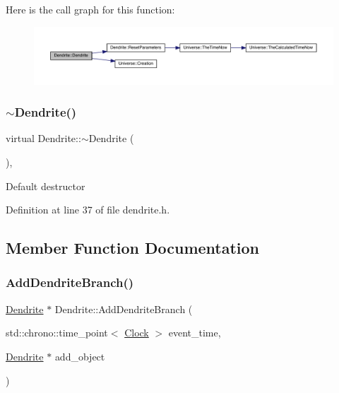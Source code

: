 Here is the call graph for this function\+:
\nopagebreak
\begin{figure}[H]
\begin{center}
\leavevmode
\includegraphics[width=350pt]{class_dendrite_ac358d84fb75919386aced214fa0e1107_cgraph}
\end{center}
\end{figure}
\mbox{\label{class_dendrite_a616c3f82655d8a3cf9cebc22e7aa2233}} 
\subsubsection{\texorpdfstring{$\sim$\+Dendrite()}{~Dendrite()}}
{\footnotesize\ttfamily virtual Dendrite\+::$\sim$\+Dendrite (\begin{DoxyParamCaption}{ }\end{DoxyParamCaption})\hspace{0.3cm}{\ttfamily [inline]}, {\ttfamily [virtual]}}

Default destructor 

Definition at line 37 of file dendrite.\+h.



\subsection{Member Function Documentation}
\mbox{\label{class_dendrite_aab6cedff35cb8c65923b14c8034cccc0}} 
\subsubsection{\texorpdfstring{Add\+Dendrite\+Branch()}{AddDendriteBranch()}}
{\footnotesize\ttfamily \hyperlink{class_dendrite}{Dendrite} $\ast$ Dendrite\+::\+Add\+Dendrite\+Branch (\begin{DoxyParamCaption}\item[{std\+::chrono\+::time\+\_\+point$<$ \hyperlink{universe_8h_a0ef8d951d1ca5ab3cfaf7ab4c7a6fd80}{Clock} $>$}]{event\+\_\+time,  }\item[{\hyperlink{class_dendrite}{Dendrite} $\ast$}]{add\+\_\+object }\end{DoxyParamCaption})}



